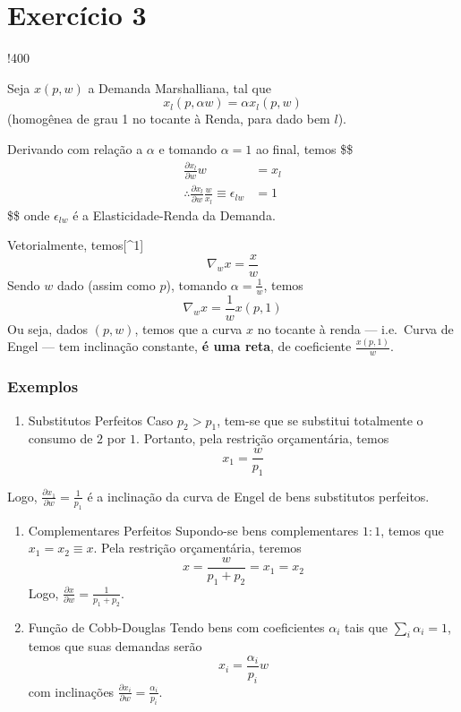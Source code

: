 \documentclass[12pt]{article}
\title{}
\author{}
\date{}
\numberwithin{equation}{section}
\theoremstyle{plain}
\theoremstyle{definition}
\theoremstyle{remark}
\begin{document}
\maketitle

\hypertarget{exercuxedcio-3}{%
\section{Exercício 3}\label{exercuxedcio-3}}

!400

Seja \(x(p,w)\) a Demanda Marshalliana, tal que \[
x_{l}(p, \alpha w) = \alpha x_{l}(p,w)
\] (homogênea de grau 1 no tocante à Renda, para dado bem \(l\)).

Derivando com relação a \(\alpha\) e tomando \(\alpha=1\) ao final,
temos \$\$ \begin{align*}
\frac{ \partial x_{l} }{ \partial w } w &= x_{l} \\
\therefore \frac{ \partial x_{l} }{ \partial w } \frac{w}{x_{l}} \equiv \epsilon_{lw} &= 1

\end{align*} \$\$ onde \(\epsilon_{lw}\) é a Elasticidade-Renda da
Demanda.

Vetorialmente, temos{[}\^{}1{]} \[
\nabla_{w} x = \frac{x}{w}
\] Sendo \(w\) dado (assim como \(p\)), tomando
\(\alpha = \frac{1}{w}\), temos \[
\nabla_{w} x = \frac{1}{w} x(p, 1)
\] Ou seja, dados \((p, w)\), temos que a curva \(x\) no tocante à renda
--- i.e.~Curva de Engel --- tem inclinação constante,
\textbf{é uma reta}, de coeficiente \(\frac{x(p,1)}{w}\).

\hypertarget{exemplos}{%
\subsubsection{Exemplos}\label{exemplos}}

\begin{enumerate}
\def\labelenumi{\arabic{enumi})}
\tightlist
\item
  Substitutos Perfeitos Caso \(p_{2}>p_{1}\), tem-se que se substitui
  totalmente o consumo de \(2\) por \(1\). Portanto, pela restrição
  orçamentária, temos \[
  x_{1} = \frac{w}{p_{1}}
  \]
\end{enumerate}

Logo, \(\frac{ \partial x_{1} }{ \partial w } = \frac{1}{p_{1}}\) é a
inclinação da curva de Engel de bens substitutos perfeitos.

\begin{enumerate}
\def\labelenumi{\arabic{enumi})}
\setcounter{enumi}{1}
\item
  Complementares Perfeitos Supondo-se bens complementares \(1:1\), temos
  que \(x_{1}=x_{2}\equiv x\). Pela restrição orçamentária, teremos \[
  x = \frac{w}{p_{1}+p_{2}} = x_{1} = x_{2}
  \] Logo,
  \(\frac{ \partial x }{ \partial w } = \frac{1}{p_{1}+p_{2}}\).
\item
  Função de Cobb-Douglas Tendo bens com coeficientes \(\alpha_{i}\) tais
  que \(\sum_{i} \alpha_{i} = 1\), temos que suas demandas serão \[
  x_{i} = \frac{\alpha_{i}}{p_{i}} w 
  \] com inclinações
  \(\frac{ \partial x_{i} }{ \partial w } = \frac{\alpha_{i}}{p_{i}}\).
\end{enumerate}
\end{document}
